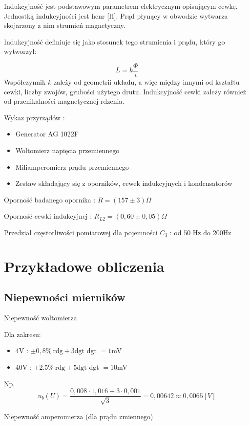 \documentclass[12pt]{article}
\begin{document}
Indukcyjność jest podstawowym parametrem elektrycznym opisującym cewkę. Jednostką indukcyjności jest henr [H].
Prąd płynący w obwodzie wytwarza skojarzony z nim strumień magnetyczny. 


Indukcyjność definiuje się jako stosunek tego strumienia i prądu, który go wytworzył:

$$ L = k \frac{\Phi}{i} $$
Współczynnik $k$ zależy od geometrii układu, a więc między innymi od kształtu cewki, liczby zwojów, grubości użytego drutu. Indukcyjność cewki zależy również od przenikalności magnetycznej rdzenia.

\bigskip
Wykaz przyrządów :
\begin{itemize}
    \item Generator AG 1022F
    \item Woltomierz napięcia przemiennego
    \item Miliamperomierz prądu przemiennego
    \item Zestaw składający się z oporników, cewek indukcyjnych i kondensatorów
\end{itemize}

Oporność badanego opornika : $ R = (157 \pm 3) \Omega $

Oporność cewki indukcyjnej : $ R_{L2} = (0,60 \pm 0,05) \Omega $

Przedział częstotliwości pomiarowej dla pojemności $C_3$ : od 50 Hz do 200Hz

\section{Przykładowe obliczenia}
\subsection{Niepewności mierników}

Niepewność woltomierza

Dla zakresu:
\begin{itemize}
    \item 4V : $ \pm 0,8 \% \ \textrm{rdg} + 3\textrm{dgt}$ \quad dgt $=1$mV
    \item 40V : $ \pm 2.5 \% \ \textrm{rdg} + 5\textrm{dgt} $ \quad dgt $=10$mV
\end{itemize} \bigskip

Np.
$$ u_b(U) = \frac{0,008 \cdot 1,016 + 3 \cdot 0,001}{\sqrt{3}} = 0,00642 \approx 0,0065[V] $$ \bigskip

Niepewność amperomierza (dla prądu zmiennego)
\end{document}
